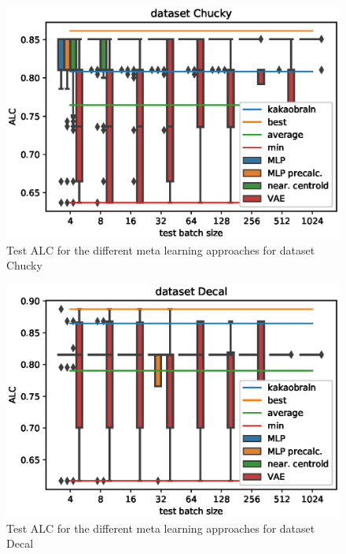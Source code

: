 \documentclass{article}
\begin{document}
%
\begin{figure}[H]
\begin{center}
 	\includegraphics[width=0.99\linewidth]{../figures/14.eps} 
\end{center}
\caption{Test ALC for the different meta learning approaches for dataset Chucky}
\label{fig:14}
\end{figure} 
%
\begin{figure}[H]
\begin{center}
 	\includegraphics[width=0.99\linewidth]{../figures/15.eps} 
\end{center}
\caption{Test ALC for the different meta learning approaches for dataset Decal}
\label{fig:15}
\end{figure} 
%
\end{document}
